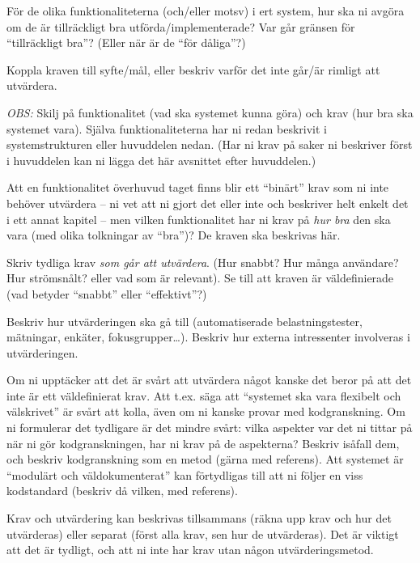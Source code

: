 För de olika funktionaliteterna (och/eller motsv) i ert system, hur ska ni avgöra om de är tillräckligt bra utförda/implementerade? Var går gränsen för ``tillräckligt bra''? (Eller när är de ``för dåliga''?)

Koppla kraven till syfte/mål, eller beskriv varför det inte går/är rimligt att utvärdera.

\emph{OBS:} Skilj på funktionalitet (vad ska systemet kunna göra) och krav (hur bra ska systemet vara). Själva funktionaliteterna har ni redan beskrivit i systemstrukturen eller huvuddelen nedan. (Har ni krav på saker ni beskriver först i huvuddelen kan ni lägga det här avsnittet efter huvuddelen.)

Att en funktionalitet överhuvud taget finns blir ett ``binärt'' krav som ni inte behöver utvärdera -- ni vet att ni gjort det eller inte och beskriver helt enkelt det i ett annat kapitel  -- men vilken funktionalitet har ni krav på \emph{hur bra} den ska vara (med olika tolkningar av ``bra'')? De kraven ska beskrivas här.

Skriv tydliga krav \emph{som går att utvärdera}.  (Hur snabbt? Hur många användare? Hur strömsnålt? eller vad som är relevant). Se till att kraven är väldefinierade (vad betyder ``snabbt'' eller ``effektivt''?)

Beskriv hur utvärderingen ska gå till (automatiserade belastningstester, mätningar, en\-käter, fokusgrupper\ldots).
Beskriv hur externa intressenter involveras i utvärderingen.

Om ni upptäcker att det är svårt att utvärdera något kanske det beror på att det inte är ett väldefinierat krav. Att t.ex. säga att ``systemet ska vara flexibelt och välskrivet'' är svårt att kolla, även om ni kanske provar med kodgranskning.
 Om ni formulerar det tydligare är det mindre svårt: vilka aspekter var det ni tittar på när ni gör kodgranskningen, har ni krav på de aspekterna? Beskriv isåfall dem, och beskriv kodgranskning som en metod (gärna med referens). Att systemet är ``modulärt och väldokumenterat'' kan förtydligas till att ni följer en viss kodstandard (beskriv då vilken, med referens).

Krav och utvärdering kan beskrivas tillsammans (räkna upp krav och hur det utvärderas) eller separat (först alla krav, sen hur de utvärderas). Det är viktigt att det är tydligt, och att ni inte har krav utan någon utvärderingsmetod.

